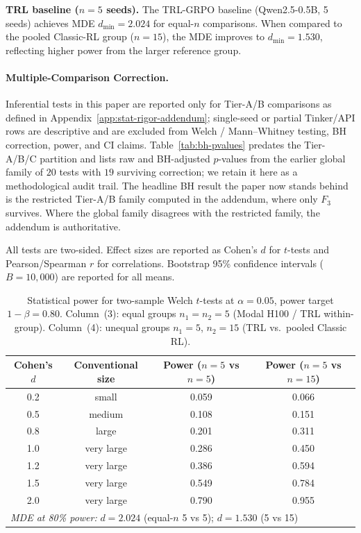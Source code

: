 \documentclass{article}
\begin{document}
\textbf{TRL baseline ($n = 5$ seeds).}
The TRL-GRPO baseline (Qwen2.5-0.5B, 5 seeds) achieves MDE
$d_{\min} = 2.024$ for equal-$n$ comparisons.
When compared to the pooled Classic-RL group ($n = 15$), the MDE
improves to $d_{\min} = 1.530$,
reflecting higher power from the larger reference group.

\paragraph{Multiple-Comparison Correction.}
Inferential tests in this paper are reported only for Tier-A/B
comparisons as defined in Appendix~\ref{app:stat-rigor-addendum};
single-seed or partial Tinker/API rows are descriptive and are
excluded from Welch / Mann--Whitney testing, BH correction, power,
and CI claims. Table~\ref{tab:bh-pvalues} predates the Tier-A/B/C
partition and lists raw and BH-adjusted $p$-values from the
earlier global family of $20$ tests with $19$ surviving correction;
we retain it here as a methodological audit trail. The headline
BH result the paper now stands behind is the restricted Tier-A/B
family computed in the addendum, where only $F_3$ survives. Where
the global family disagrees with the restricted family, the
addendum is authoritative.

All tests are two-sided.  Effect sizes are reported as Cohen's $d$ for
$t$-tests and Pearson/Spearman $r$ for correlations.  Bootstrap 95\%
confidence intervals ($B = 10{,}000$) are reported for all means.

\begin{table}[!ht]
\centering
\caption{Statistical power for two-sample Welch $t$-tests at $\alpha = 0.05$,
         power target $1{-}\beta = 0.80$.
         Column~(3): equal groups $n_1 = n_2 = 5$ (Modal H100 / TRL within-group).
         Column~(4): unequal groups $n_1 = 5$, $n_2 = 15$ (TRL vs.\ pooled Classic RL).}
\label{tab:power-analysis}
\small
\begin{tabular}{@{}cccc@{}}
\toprule
Cohen's $d$ & Conventional size & Power ($n{=}5$ vs $n{=}5$) & Power ($n{=}5$ vs $n{=}15$) \\
\midrule
        0.2 & small & 0.059 & 0.066 \\
        0.5 & medium & 0.108 & 0.151 \\
        0.8 & large & 0.201 & 0.311 \\
        1.0 & very large & 0.286 & 0.450 \\
        1.2 & very large & 0.386 & 0.594 \\
        1.5 & very large & 0.549 & 0.784 \\
        2.0 & very large & 0.790 & 0.955 \\
\midrule
\multicolumn{4}{l}{\textit{MDE at 80\% power:} $d = 2.024$ (equal-$n$ 5 vs 5);\; $d = 1.530$ (5 vs 15)} \\
\bottomrule
\end{tabular}
\end{table}
\end{document}
